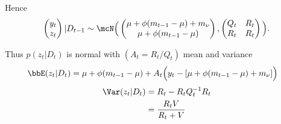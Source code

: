 \documentclass{article}
\begin{document}
\begin{description}
Hence
\[
\begin{pmatrix}
y_t \\
z_t
\end{pmatrix} | D_{t-1} 
\sim
\mcN
\Big(
\begin{pmatrix}
\mu + \phi(m_{t-1} - \mu) + m_\nu \\
\mu + \phi(m_{t-1} - \mu)
\end{pmatrix} ,
\begin{pmatrix}
Q_t & R_t \\
R_t & R_t
\end{pmatrix}
\Big).
\]

\end{description}

Thus $p(z_t | D_t)$ is normal with $(A_t = R_t/Q_t)$ mean and variance
\begin{align*}
\bbE(z_t | D_t) 
& = \mu + \phi(m_{t-1} - \mu) + A_t \Big( y_t - [ \mu + \phi(m_{t-1} - \mu) + m_\nu] \Big)
\end{align*}
\begin{align*}
\Var(z_t | D_t) 
& = R_t - R_t Q_t^{-1} R_t \\
& = \frac{R_t V}{R_t + V}
\end{align*}
\end{document}
